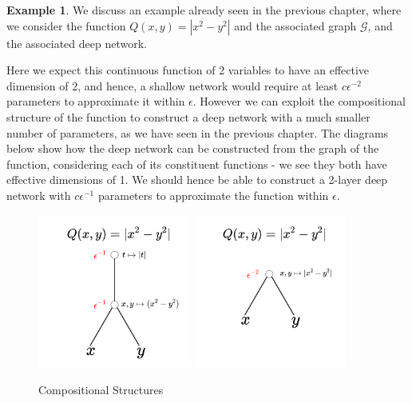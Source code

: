 \documentclass[11pt,a4paper]{article}
\theoremstyle{plain}
\theoremstyle{definition}
\newtheorem{example}[theorem]{Example}
\theoremstyle{remark}
\begin{document}
\begin{example}
    We discuss an example already seen in the previous chapter, where we consider the function $Q(x, y) = |x^{2}  - y^{2}|$ and the associated graph $\mathcal{G}$, and the associated deep network. 

    Here we expect this continuous function of 2 variables to have an effective dimension of 2, and hence, a shallow network would require at least \(c \epsilon^{-2} \) parameters to approximate it within \(\epsilon \). However we can exploit the compositional structure of the function to construct a deep network with a much smaller number of parameters, as we have seen in the previous chapter. The diagrams below show how the deep network can be constructed from the graph of the function, considering each of its constituent functions - we see they both have effective dimensions of 1. We should hence be able to construct a 2-layer deep network with \(c \epsilon^{-1} \) parameters to approximate the function within \(\epsilon \).
    
    \begin{figure}[h]
        \centering
        \includegraphics[width=0.45\textwidth]{diags/Comp.png}
        \includegraphics[width=0.45\textwidth]{diags/CompShallow.png}
        \caption{Compositional Structures}
    \end{figure}
    

\end{example}
\end{document}
